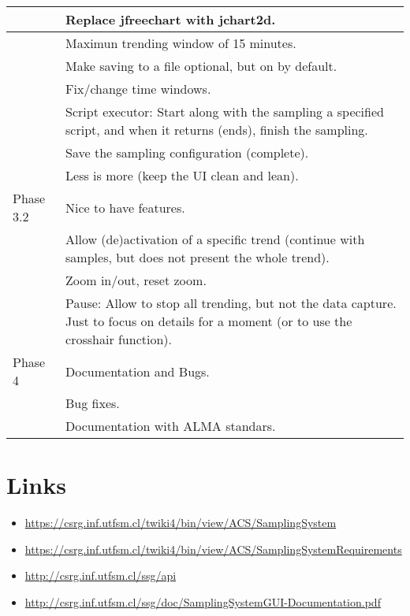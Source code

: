 \documentclass[letter, 10pt]{article}
\begin{document}
\begin{tabular}{|l|p{9.5cm}|}
 	     & Replace jfreechart with jchart2d.\\\hline
 	     & Maximun trending window of 15 minutes.\\\hline
 	     & Make saving to a file optional, but on by default.\\\hline
 	     & Fix/change time windows.\\\hline
 	     & Script executor: Start along with the sampling a specified script, and when it returns (ends), finish the sampling.\\\hline
 	     & Save the sampling configuration (complete).\\\hline
 	     & Less is more (keep the UI clean and lean).\\\hline
Phase 3.2& Nice to have features.\\\hline
 	     & Allow (de)activation of a specific trend (continue with samples, but does not present the whole trend).\\\hline
 	     & Zoom in/out, reset zoom.\\\hline
 	     & Pause: Allow to stop all trending, but not the data capture. Just to focus on details for a moment (or to use the crosshair function).\\\hline
Phase 4& Documentation and Bugs.\\\hline
 	   & Bug fixes.\\\hline
 	   & Documentation with ALMA standars.\\\hline
\end{tabular}

\section{Links}

\begin{itemize}
	\item \url{https://csrg.inf.utfsm.cl/twiki4/bin/view/ACS/SamplingSystem}
	\item \url{https://csrg.inf.utfsm.cl/twiki4/bin/view/ACS/SamplingSystemRequirements}
	\item \url{http://csrg.inf.utfsm.cl/ssg/api}
	\item \url{http://csrg.inf.utfsm.cl/ssg/doc/SamplingSystemGUI-Documentation.pdf}
\end{itemize}
\end{document}

